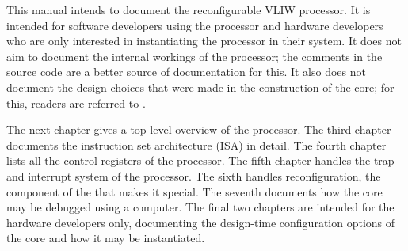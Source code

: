 
This manual intends to document the \rvex{} reconfigurable VLIW processor. It is
intended for software developers using the processor and hardware developers who
are only interested in instantiating the processor in their system. It does not
aim to document the internal workings of the processor; the comments in the
source code are a better source of documentation for this. It also does not
document the design choices that were made in the construction of the core; for
this, readers are referred to \cite{vanstraten2016}.

The next chapter gives a top-level overview of the processor. The third chapter
documents the instruction set architecture (ISA) in detail. The fourth chapter
lists all the control registers of the processor. The fifth chapter handles the
trap and interrupt system of the processor. The sixth handles reconfiguration,
the component of the \rvex{} that makes it special. The seventh documents how
the core may be debugged using a computer. The final two chapters are intended
for the hardware developers only, documenting the design-time configuration
options of the core and how it may be instantiated.

